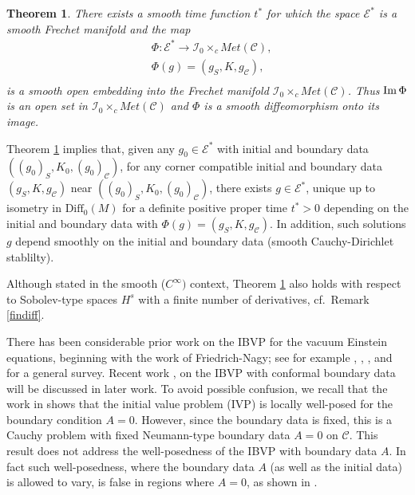 \documentclass[10pt]{amsart}
\newcommand{\cC}{{\mathcal C}}
\newcommand{\cE}{{\mathcal E}}
\newcommand{\cI}{\mathcal I}
\newcommand{\Diff}{\mathrm{Diff}}
\newcommand{\be}{\begin{equation}}
\newcommand{\ee}{\end{equation}}
\renewcommand{\to}{\rightarrow}
\newcommand{\<}{\langle}
\renewcommand{\>}{\rangle}
\theoremstyle{plain}
\newtheorem{theorem}[lemma]{Theorem}
\theoremstyle{remark}
\theoremstyle{definition}
\numberwithin{equation}{section}
\begin{document}
\begin{theorem} \label{mainthm}
There exists a smooth time function $t^*$ for which the space $\cE^*$ is a smooth Frechet manifold and the map 
\be \label{mainPhi}
\begin{split}
&\Phi: \cE^* \to \cI_0 \times_c Met(\cC),\\
&\Phi(g) = (g_S, K, g_{\cC}),\\
\end{split}
\ee
is a smooth open embedding into the Frechet manifold $\cI_0 \times_c Met(\cC)$. Thus ${\rm Im} \, \Phi$ is an open set in 
$\cI_0 \times_c Met(\cC)$ and $\Phi$ is a smooth diffeomorphism onto its image. 

\end{theorem}

  Theorem \ref{mainthm} implies that, given any $g_0 \in \cE^*$ with initial and boundary data $((g_0)_S, K_0, (g_0)_{\cC})$, for any corner 
compatible initial and boundary data $(g_S, K, g_{\cC})$ near $((g_0)_S, K_0, (g_0)_{\cC})$, there exists $g \in \cE^*$, unique up to 
isometry in $\Diff_0(M)$ for a definite positive proper time $t^* > 0$ depending on the initial and boundary data with $\Phi(g) = (g_S, K, g_{\cC})$. 
In addition, such solutions $g$ depend smoothly on the initial and boundary data (smooth Cauchy-Dirichlet stablilty). 

  Although stated in the smooth ($C^{\infty})$ context, Theorem \ref{mainthm} also holds with respect to Sobolev-type spaces $H^s$ with a finite 
number of derivatives, cf.~Remark \ref{findiff}. 
 
\medskip
   
   There has been considerable prior work on the IBVP for the vacuum Einstein equations, beginning with the work \cite{FN} of Friedrich-Nagy; see 
for example \cite{KRSW1}, \cite{KRSW2}, \cite{FS1}, \cite{FS2} and \cite{ST} for a general survey. Recent work \cite{LSW}, \cite{LRSW} on the IBVP with conformal 
boundary data will be discussed in later work. To avoid possible confusion, we recall that the work in \cite{FS1} shows that the initial value problem (IVP) is locally 
well-posed for the boundary condition $A = 0$. However, since the boundary data is fixed, this is a Cauchy problem with fixed Neumann-type boundary data $A = 0$ 
on $\cC$. This result does not address the well-posedness of the IBVP with boundary data $A$. In fact such well-posedness, where the boundary data $A$ (as well 
as the initial data) is allowed to vary, is false in regions where $A = 0$, as shown in \cite{AA2}. 
\end{document}
